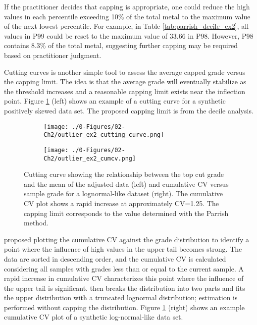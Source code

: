 If the practitioner decides that capping is appropriate, one could reduce the high values in each percentile exceeding 10\% of the total metal to the maximum value of the next lowest percentile. For example, in Table \ref{tab:parrish_decile_ex2}, all values in P99 could be reset to the maximum value of 33.66 in P98. However, P98 contains 8.3\% of the total metal, suggesting further capping may be required based on practitioner judgment.

Cutting curves \citep{roscoe1996cutting,leuangthong2015dealing} is another simple tool to assess the average capped grade versus the capping limit. The idea is that the average grade will eventually stabilize as the threshold increases and a reasonable capping limit exists near the inflection point. Figure \ref{fig:cutting_cv} (left) shows an example of a cutting curve for a synthetic positively skewed data set. The proposed capping limit is from the decile analysis.

\begin{figure}[!htb]
    \begin{subfigure}{0.5\textwidth}
        \centering
        \texttt{[image: ./0-Figures/02-Ch2/outlier\_ex2\_cutting\_curve.png]}
    \end{subfigure}
    \begin{subfigure}{0.5\textwidth}
        \centering
        \texttt{[image: ./0-Figures/02-Ch2/outlier\_ex2\_cumcv.png]}
    \end{subfigure}
    \caption{Cutting curve showing the relationship between the top cut grade and the mean of the adjusted data (left) and cumulative \gls{CV} versus sample grade for a lognormal-like dataset (right). The cumulative \gls{CV} plot shows a rapid increase at approximately CV=1.25. The capping limit corresponds to the value determined with the Parrish method.}
    \label{fig:cutting_cv}
\end{figure}

\cite{parker1991statistical} proposed plotting the cumulative \gls{CV} against the grade distribution to identify a point where the influence of high values in the upper tail becomes strong. The data are sorted in descending order, and the cumulative \gls{CV} is calculated considering all samples with grades less than or equal to the current sample. A rapid increase in cumulative \gls{CV} characterizes this point where the influence of the upper tail is significant. \cite{parker1991statistical} then breaks the distribution into two parts and fits the upper distribution with a truncated lognormal distribution; estimation is performed without capping the distribution. Figure \ref{fig:cutting_cv} (right) shows an example cumulative \gls{CV} plot of a synthetic log-normal-like data set.

